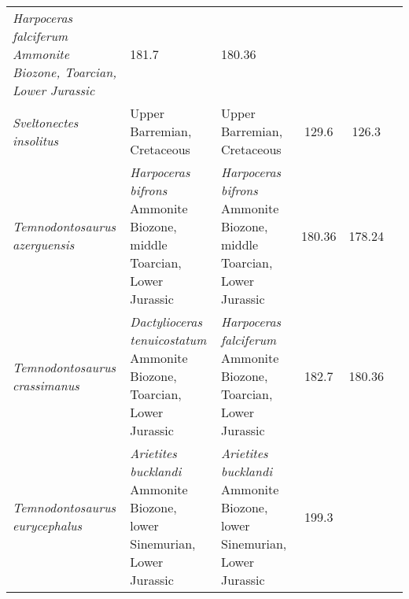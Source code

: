 \begin{longtabu}{>{\itshape}lXXSSl}
        \emph{Harpoceras falciferum} Ammonite Biozone, Toarcian, Lower Jurassic
                                                                      & 181.7
                                                                      & 180.36
                                                                      &
                                                                      \cite{vonHuene1922,Maisch1998NJGPAd} \\          
	Sveltonectes insolitus                               & Upper Barremian,
        Cretaceous
                                                             & Upper Barremian,
        Cretaceous
                                                             & 129.6
                                                             & 126.3
                                                             &
                                                             \cite{Fischer2011JVP} \\                   
	Temnodontosaurus azerguensis                         & \emph{Harpoceras
        bifrons} Ammonite Biozone, middle Toarcian, Lower Jurassic
                                                             & \emph{Harpoceras
        bifrons} Ammonite Biozone, middle Toarcian, Lower Jurassic
                                                             & 180.36
                                                             & 178.24
                                                             & \cite{Martin2012P} \\                     
	Temnodontosaurus crassimanus                         &
        \emph{Dactylioceras tenuicostatum} Ammonite Biozone, Toarcian, Lower
        Jurassic                                                      &
        \emph{Harpoceras falciferum} Ammonite Biozone, Toarcian, Lower Jurassic
                                                                      & 182.7
                                                                      & 180.36
                                                                      &
                                                                      \cite{Melmore1930AMNH} \\                    
	Temnodontosaurus eurycephalus                        & \emph{Arietites
        bucklandi} Ammonite Biozone, lower Sinemurian, Lower Jurassic
                                                             & \emph{Arietites
        bucklandi} Ammonite Biozone, lower Sinemurian, Lower Jurassic
                                                             & 199.3

\end{longtabu}
